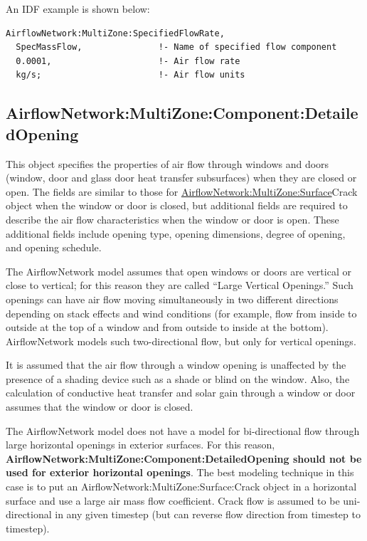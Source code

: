 An IDF example is shown below:

\begin{lstlisting}
AirflowNetwork:MultiZone:SpecifiedFlowRate,
  SpecMassFlow,               !- Name of specified flow component
  0.0001,                     !- Air flow rate
  kg/s;                       !- Air flow units
\end{lstlisting}

\subsection{AirflowNetwork:MultiZone:Component:DetailedOpening}\label{airflownetworkmultizonecomponentdetailedopening}

This object specifies the properties of air flow through windows and doors (window, door and glass door heat transfer subsurfaces) when they are closed or open. The fields are similar to those for \hyperref[airflownetworkmultizonesurface]{AirflowNetwork:MultiZone:Surface}Crack object when the window or door is closed, but additional fields are required to describe the air flow characteristics when the window or door is open. These additional fields include opening type, opening dimensions, degree of opening, and opening schedule.

The AirflowNetwork model assumes that open windows or doors are vertical or close to vertical; for this reason they are called ``Large Vertical Openings.'' Such openings can have air flow moving simultaneously in two different directions depending on stack effects and wind conditions (for example, flow from inside to outside at the top of a window and from outside to inside at the bottom). AirflowNetwork models such two-directional flow, but only for vertical openings.

It is assumed that the air flow through a window opening is unaffected by the presence of a shading device such as a shade or blind on the window. Also, the calculation of conductive heat transfer and solar gain through a window or door assumes that the window or door is closed.

The AirflowNetwork model does not have a model for bi-directional flow through large horizontal openings in exterior surfaces. For this reason, \textbf{Air\-flow\-Net\-work:\-Multi\-Zone:\-Component:\-Detailed\-Opening should not be used for exterior horizontal openings}. The best modeling technique in this case is to put an Air\-flow\-Net\-work:\-Multi\-Zone:\-Sur\-face:\-Crack object in a horizontal surface and use a large air mass flow coefficient. Crack flow is assumed to be uni-directional in any given timestep (but can reverse flow direction from timestep to timestep).

